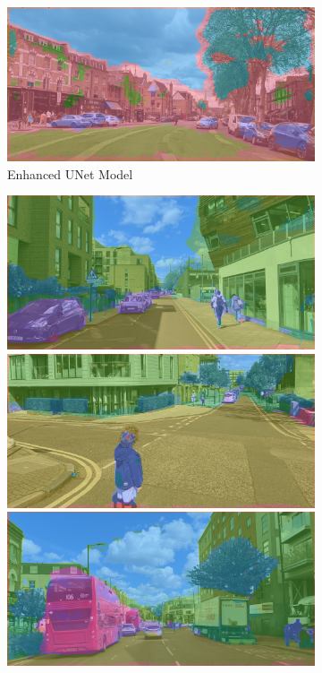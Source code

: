 \begin{figure}[H]
\begin{subfigure}[t]{.32\textwidth}
		\includegraphics[width=\textwidth]{city_images/HackneyScapes/Hackney3204_unet.png}
		\caption{Enhanced UNet Model}
	\end{subfigure}
	\hfill{}\begin{subfigure}[t]{.32\textwidth}
		\includegraphics[width=\textwidth]{city_images/HackneyScapes/Hackney3159_swin2_no_background.png} \\[5pt]
		\includegraphics[width=\textwidth]{city_images/HackneyScapes/Hackney3171_swin2_no_background.png} \\[5pt]
		\includegraphics[width=\textwidth]{city_images/HackneyScapes/Hackney3200_swin2_no_background.png} \\[5pt]

\end{subfigure}
\end{figure}
